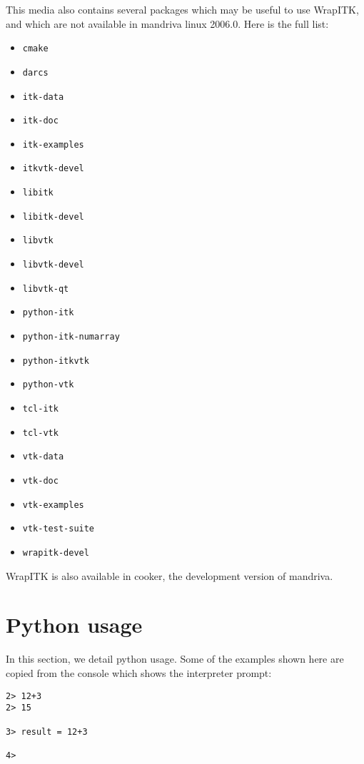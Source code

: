 \documentclass{InsightArticle}
\begin{document}
This media also contains several packages which may be useful to use WrapITK,
and which are not available in mandriva linux 2006.0. Here is the full list:
\begin{itemize}
  \item \verb$cmake$
  \item \verb$darcs$
  \item \verb$itk-data$
  \item \verb$itk-doc$
  \item \verb$itk-examples$
  \item \verb$itkvtk-devel$
  \item \verb$libitk$
  \item \verb$libitk-devel$
  \item \verb$libvtk$
  \item \verb$libvtk-devel$
  \item \verb$libvtk-qt$
  \item \verb$python-itk$
  \item \verb$python-itk-numarray$
  \item \verb$python-itkvtk$
  \item \verb$python-vtk$
  \item \verb$tcl-itk$
  \item \verb$tcl-vtk$
  \item \verb$vtk-data$
  \item \verb$vtk-doc$
  \item \verb$vtk-examples$
  \item \verb$vtk-test-suite$
  \item \verb$wrapitk-devel$
\end{itemize}

WrapITK is also available in cooker, the development version of mandriva.


  \section{Python usage}

In this section, we detail python usage. Some of the examples shown here are copied
from the console which shows the interpreter prompt:

\begin{verbatim}
2> 12+3
2> 15

3> result = 12+3

4> 
\end{verbatim}
\end{document}
